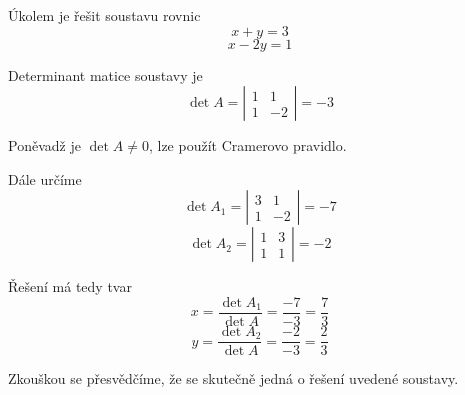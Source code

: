 \begin{priklad}
Úkolem je řešit soustavu rovnic
 $$x + y = 3$$
 $$x - 2y = 1$$

Determinant matice soustavy je
 $$\det A = \left| \begin{array}{cc}1 & 1 \\ 1 & -2\end{array} \right| = -3$$

Poněvadž je $\det A \neq 0$, lze použít Cramerovo pravidlo.

Dále určíme
 $$\det A_1 = \left| \begin{array}{cc}3 & 1 \\ 1 & -2\end{array} \right| = -7$$
 $$\det A_2 = \left| \begin{array}{cc}1 & 3 \\ 1 & 1\end{array} \right| = -2$$

Řešení má tedy tvar
 $$x = \frac{\det A_1}{\det A} = \frac{-7}{-3} = \frac{7}{3}$$
 $$y = \frac{\det A_2}{\det A} = \frac{-2}{-3} = \frac{2}{3}$$

Zkouškou se přesvědčíme, že se skutečně jedná o řešení uvedené soustavy.
\end{priklad}
